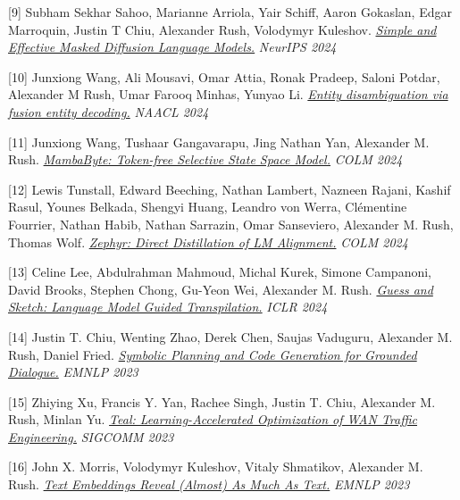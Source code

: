 \documentclass[10pt]{article}
\begin{document}
\medskip


[9] \ind Subham Sekhar Sahoo, Marianne Arriola, Yair Schiff, Aaron Gokaslan, Edgar Marroquin, Justin T Chiu, Alexander Rush, Volodymyr Kuleshov. \emph{\href{ https://arxiv.org/abs/2406.07524 }{ Simple and Effective Masked Diffusion Language Models.} }\emph{ NeurIPS 2024 }

\medskip


[10] \ind Junxiong Wang, Ali Mousavi, Omar Attia, Ronak Pradeep, Saloni Potdar, Alexander M Rush, Umar Farooq Minhas, Yunyao Li. \emph{\href{ https://arxiv.org/abs/2404.01626 }{ Entity disambiguation via fusion entity decoding.} }\emph{ NAACL 2024 }

\medskip


[11] \ind Junxiong Wang, Tushaar Gangavarapu, Jing Nathan Yan, Alexander M. Rush. \emph{\href{ https://arxiv.org/abs/2401.13660 }{ MambaByte: Token-free Selective State Space Model.} }\emph{ COLM 2024 }

\medskip


[12] \ind Lewis Tunstall, Edward Beeching, Nathan Lambert, Nazneen Rajani, Kashif Rasul, Younes Belkada, Shengyi Huang, Leandro von Werra, Clémentine Fourrier, Nathan Habib, Nathan Sarrazin, Omar Sanseviero, Alexander M. Rush, Thomas Wolf. \emph{\href{ https://arxiv.org/pdf/2310.16944.pdf }{ Zephyr: Direct Distillation of LM Alignment.} }\emph{ COLM 2024 }

\medskip


[13] \ind Celine Lee, Abdulrahman Mahmoud, Michal Kurek, Simone Campanoni, David Brooks, Stephen Chong, Gu-Yeon Wei, Alexander M. Rush. \emph{\href{ https://arxiv.org/pdf/2309.14396.pdf }{ Guess and Sketch: Language Model Guided Transpilation.} }\emph{ ICLR 2024 }

\medskip


[14] \ind Justin T. Chiu, Wenting Zhao, Derek Chen, Saujas Vaduguru, Alexander M. Rush, Daniel Fried. \emph{\href{ https://arxiv.org/pdf/2310.17140.pdf }{ Symbolic Planning and Code Generation for Grounded Dialogue.} }\emph{ EMNLP 2023 }

\medskip


[15] \ind Zhiying Xu, Francis Y. Yan, Rachee Singh, Justin T. Chiu, Alexander M. Rush, Minlan Yu. \emph{\href{ https://arxiv.org/abs/2210.13763 }{ Teal: Learning-Accelerated Optimization of WAN Traffic Engineering.} }\emph{ SIGCOMM 2023 }

\medskip


[16] \ind John X. Morris, Volodymyr Kuleshov, Vitaly Shmatikov, Alexander M. Rush. \emph{\href{ https://arxiv.org/pdf/2310.06816.pdf }{ Text Embeddings Reveal (Almost) As Much As Text.} }\emph{ EMNLP 2023 }
\end{document}
